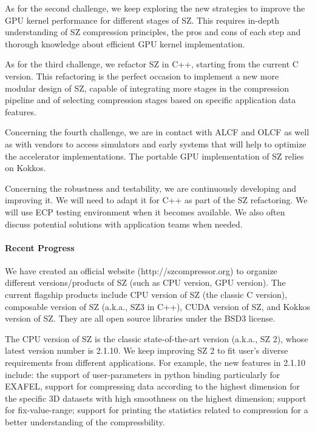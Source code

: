 As for the second challenge, we keep exploring the new strategies to improve the GPU kernel performance for different stages of SZ. This requires in-depth understanding of SZ compression principles, the pros and cons of each step and thorough knowledge about efficient GPU kernel implementation.  

As for the third challenge, we refactor SZ in C++, starting from the current C version. This refactoring is the perfect occasion to implement a new more modular design of SZ, capable of integrating more stages in the compression pipeline and of selecting compression stages based on specific application data features.

Concerning the fourth challenge, we are in contact with ALCF and OLCF as well as with vendors to access simulators and early systems that will help to optimize the accelerator implementations. The portable GPU implementation of SZ relies on Kokkos.

Concerning the robustness and testability, we are continuously developing and improving it. We will need to adapt it for C++ as part of the SZ refactoring. We will use ECP testing environment when it becomes available. We also often discuss potential solutions with application teams when needed. 


\paragraph{Recent Progress}

We have created an official website (http://szcompressor.org) to organize different versions/products of SZ (such as CPU version, GPU version). The current flagship products include CPU version of SZ (the classic C version), composable version of SZ (a.k.a., SZ3 in C++), CUDA version of SZ, and Kokkos version of SZ. They are all open source libraries under the BSD3 license.

The CPU version of SZ is the classic state-of-the-art version (a.k.a., SZ 2), whose latest version number is 2.1.10. We keep improving SZ 2 to fit user's diverse requirements from different applications. For example, the new features in 2.1.10 include:  the support of user-parameters in python binding particularly for EXAFEL, support for compressing data according to the highest dimension for the specific 3D datasets with high smoothness on the highest dimension; support for fix-value-range; support for printing the statistics related to compression for a better understanding of the compressbility. %


